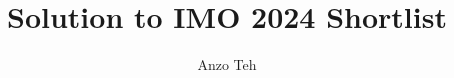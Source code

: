 \documentclass[11pt,a4paper]{article}
\begin{document}
	\newcommand{\la}{\leftarrow}
	\newcommand{\lra}{\leftrightarrow}
	\newcommand{\bbN}{{\mathbb N}}
	\newcommand{\bbZ}{{\mathbb Z}}
	\newcommand{\bbQ}{{\mathbb Q}}
	\newcommand{\bbR}{{\mathbb R}}
	\newcommand{\bbC}{{\mathbb C}}
	\newcommand{\bbH}{{\mathbb H}}
	\newcommand{\dfeq}{\stackrel{\mathrm{def}}{=}}
	\newcommand{\ra}{\rightarrow}
	\newcommand{\Span}{\mathrm{span}}
	\newcommand{\scrP}{\mathscr{P}}
	\newcommand{\rank}{\mathrm{rank}}
	\newcommand{\nullity}{\mathrm{nullity}}
	\newcommand{\Col}{\mathrm{Col}}
	\newcommand{\Row}{\mathrm{Row}}
	\newcommand{\tr}{\mathrm{tr}}
	\newcommand{\ol}{\overline}
	\newcommand{\norm}[1]{||#1||}
	\newcommand{\doubleline}[1]{\underline{\underline{#1}}}
	\newcommand{\elemop}[1]{\stackrel{#1}{\longrightarrow}}
	\newcommand{\Ind}{\mathrm{Ind}}
	\newcommand{\Res}{\mathrm{Res}}
	\newcommand{\End}{\mathrm{End}}
	\newcommand{\cl}{\mathrm{cl}}
	\newcommand{\code}[1]{\texttt{#1}}
	\newcommand\tab[1][0.5cm]{\hspace*{#1}}
	\newcommand{\<}{\langle}
	\renewcommand{\>}{\rangle}
	\newcommand{\qubits}[1]{|{#1}\rangle}
	\newcommand{\powset}{\mathcal{P}}
	\newcommand{\dsum}{\displaystyle\sum}
	\newcommand{\dprod}{\displaystyle\prod}
	
	\newtheorem{lemma}{Lemma}
	
	\title{Solution to IMO 2024 Shortlist}
	\date{}
	\author{Anzo Teh}
	\maketitle
\end{document}
